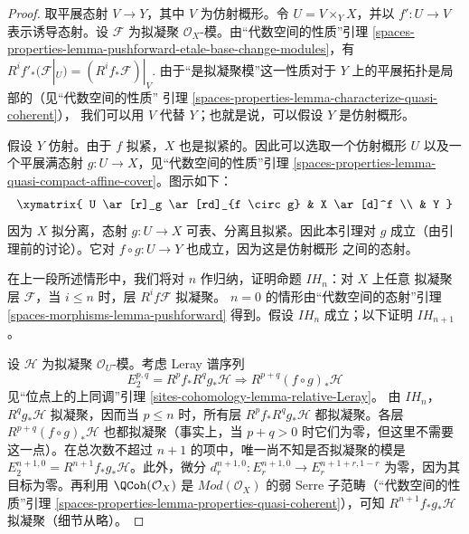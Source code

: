\begin{proof}
取平展态射 $V \to Y$，其中 $V$ 为仿射概形。令 $U = V \times_Y X$，并以
$f' : U \to V$ 表示诱导态射。设 $\mathcal{F}$ 为拟凝聚
$\mathcal{O}_X$-模。由“代数空间的性质”引理
\ref{spaces-properties-lemma-pushforward-etale-base-change-modules}，有
$R^if'_*(\mathcal{F}|_U) = (R^if_*\mathcal{F})|_V$.
由于“是拟凝聚模”这一性质对于 $Y$ 上的平展拓扑是局部的（见“代数空间的性质”
引理 \ref{spaces-properties-lemma-characterize-quasi-coherent}），
我们可以用 $V$ 代替 $Y$；也就是说，可以假设 $Y$ 是仿射概形。

\medskip\noindent
假设 $Y$ 仿射。由于 $f$ 拟紧，$X$ 也是拟紧的。因此可以选取一个仿射概形
$U$ 以及一个平展满态射 $g : U \to X$，见“代数空间的性质”引理
\ref{spaces-properties-lemma-quasi-compact-affine-cover}。图示如下：
$$
\xymatrix{
U \ar[r]_g \ar[rd]_{f \circ g} & X \ar[d]^f \\
& Y
}
$$
因为 $X$ 拟分离，态射 $g : U \to X$ 可表、分离且拟紧。因此本引理对 $g$
成立（由引理前的讨论）。它对 $f \circ g : U \to Y$ 也成立，因为这是仿射概形
之间的态射。

\medskip\noindent
在上一段所述情形中，我们将对 $n$ 作归纳，证明命题 $IH_n$：对 $X$ 上任意
拟凝聚层 $\mathcal{F}$，当 $i \leq n$ 时，层 $R^if\mathcal{F}$ 拟凝聚。
$n = 0$ 的情形由“代数空间的态射”引理
\ref{spaces-morphisms-lemma-pushforward} 得到。假设 $IH_n$ 成立；以下证明
$IH_{n + 1}$。

\medskip\noindent
设 $\mathcal{H}$ 为拟凝聚 $\mathcal{O}_U$-模。考虑 Leray 谱序列
$$
E_2^{p, q} = R^pf_* R^qg_* \mathcal{H}
\Rightarrow
R^{p + q}(f \circ g)_*\mathcal{H}
$$
见“位点上的上同调”引理 \ref{sites-cohomology-lemma-relative-Leray}。
由 $IH_n$，$R^qg_*\mathcal{H}$ 拟凝聚，因而当 $p \leq n$ 时，所有层
$R^pf_*R^qg_*\mathcal{H}$ 都拟凝聚。各层
$R^{p + q}(f \circ g)_*\mathcal{H}$ 也都拟凝聚（事实上，当
$p + q > 0$ 时它们为零，但这里不需要这一点）。在总次数不超过
$n + 1$ 的项中，唯一尚不知是否拟凝聚的模是
$E_2^{n + 1, 0} = R^{n + 1}f_*g_*\mathcal{H}$。此外，微分
$d_r^{n + 1, 0} : E_r^{n + 1, 0} \to E_r^{n + 1 + r, 1 - r}$
为零，因为其目标为零。再利用 $\QCoh(\mathcal{O}_X)$ 是
$\textit{Mod}(\mathcal{O}_X)$ 的弱 Serre 子范畴（“代数空间的性质”引理
\ref{spaces-properties-lemma-properties-quasi-coherent}），可知
$R^{n + 1}f_*g_*\mathcal{H}$ 拟凝聚（细节从略）。


\end{proof}
